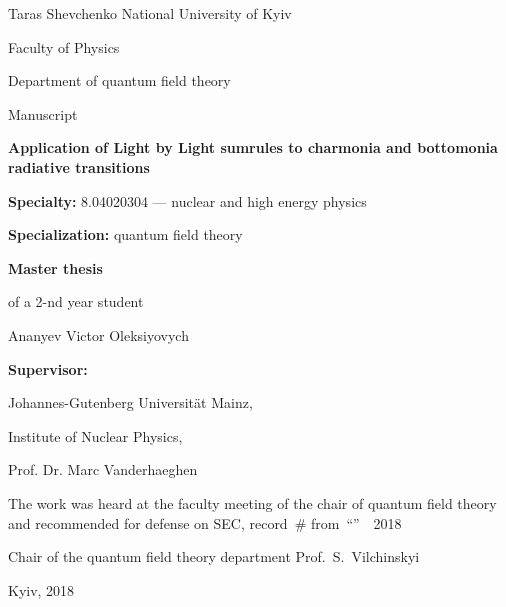 \begin{titlepage}
    \fontsize{12}{12}\selectfont

    \begin{center}
        Taras Shevchenko National University of Kyiv

        Faculty of Physics

        Department of quantum field theory
    \end{center}

    \begin{flushright}
        Manuscript
    \end{flushright}

    \vfill

    \begin{center}
        \textbf{Application of Light by Light sumrules to charmonia and bottomonia radiative transitions}
    \end{center}

    \vfill

    \textbf{Specialty:} 8.04020304 --- nuclear and high energy physics

    \textbf{Specialization:} quantum field theory

    \vfill

    \hfill\parbox[t]{8cm}{
        \textbf{Master thesis}

        of a 2-nd year student

        Ananyev Victor Oleksiyovych
    }

    \vspace{1cm}

    \hfill\parbox[t]{8cm}{
        \textbf{Supervisor:}

        Johannes-Gutenberg Universität Mainz,

        Institute of Nuclear Physics,
        
        Prof. Dr. Marc Vanderhaeghen
    }

    \vfill

    {\small
        \noindent The work was heard at the faculty meeting of the chair of quantum field theory and recommended for defense on SEC, record~\# from~``''~~2018

        \vspace{0.5cm}

        \noindent Chair of the quantum field theory department \hfill  Prof.~S.~Vilchinskyi
    }

    \vspace{0.8cm}

    \begin{center}
        Kyiv, 2018
    \end{center}
\end{titlepage}
